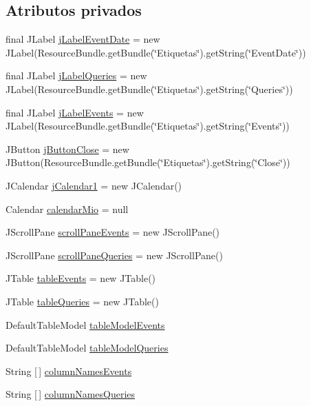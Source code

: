 \subsection*{Atributos privados}
\begin{DoxyCompactItemize}
\item 
final J\+Label \mbox{\hyperlink{classgui_1_1FindQuestionsGUI_a490e1658b079f1999219d1eb7c5bd0c4}{j\+Label\+Event\+Date}} = new J\+Label(Resource\+Bundle.\+get\+Bundle(\char`\"{}Etiquetas\char`\"{}).get\+String(\char`\"{}Event\+Date\char`\"{}))
\item 
final J\+Label \mbox{\hyperlink{classgui_1_1FindQuestionsGUI_a7e0f66edb87cb23a1ed731a4cbbf6679}{j\+Label\+Queries}} = new J\+Label(Resource\+Bundle.\+get\+Bundle(\char`\"{}Etiquetas\char`\"{}).get\+String(\char`\"{}Queries\char`\"{}))
\item 
final J\+Label \mbox{\hyperlink{classgui_1_1FindQuestionsGUI_a44489404c630d443ef23d756a0a59ddd}{j\+Label\+Events}} = new J\+Label(Resource\+Bundle.\+get\+Bundle(\char`\"{}Etiquetas\char`\"{}).get\+String(\char`\"{}Events\char`\"{}))
\item 
J\+Button \mbox{\hyperlink{classgui_1_1FindQuestionsGUI_aa434da3107eda36011f1dd89b1c02d65}{j\+Button\+Close}} = new J\+Button(Resource\+Bundle.\+get\+Bundle(\char`\"{}Etiquetas\char`\"{}).get\+String(\char`\"{}Close\char`\"{}))
\item 
J\+Calendar \mbox{\hyperlink{classgui_1_1FindQuestionsGUI_ae9cccb6f4b0319f8d786fa5040d6bed3}{j\+Calendar1}} = new J\+Calendar()
\item 
Calendar \mbox{\hyperlink{classgui_1_1FindQuestionsGUI_ae91cb03b6f7c5fd36436fcb4ec118613}{calendar\+Mio}} = null
\item 
J\+Scroll\+Pane \mbox{\hyperlink{classgui_1_1FindQuestionsGUI_ace1a155185cdae07dc3ed59a80f173fa}{scroll\+Pane\+Events}} = new J\+Scroll\+Pane()
\item 
J\+Scroll\+Pane \mbox{\hyperlink{classgui_1_1FindQuestionsGUI_a7657e8883157c1d005bb73744458bbf8}{scroll\+Pane\+Queries}} = new J\+Scroll\+Pane()
\item 
J\+Table \mbox{\hyperlink{classgui_1_1FindQuestionsGUI_a022fc8764d950afede789bb83ce7b5aa}{table\+Events}} = new J\+Table()
\item 
J\+Table \mbox{\hyperlink{classgui_1_1FindQuestionsGUI_a593cb17bb67700c97f5cf1dcd636526f}{table\+Queries}} = new J\+Table()
\item 
Default\+Table\+Model \mbox{\hyperlink{classgui_1_1FindQuestionsGUI_a142cc8ef4c568a9fa22bbd21393dcd66}{table\+Model\+Events}}
\item 
Default\+Table\+Model \mbox{\hyperlink{classgui_1_1FindQuestionsGUI_aec87a2a23f53df34886c52c6bb405666}{table\+Model\+Queries}}
\item 
String \mbox{[}$\,$\mbox{]} \mbox{\hyperlink{classgui_1_1FindQuestionsGUI_a7d72ae353614e87787788d83e329a2e7}{column\+Names\+Events}}
\item 
String \mbox{[}$\,$\mbox{]} \mbox{\hyperlink{classgui_1_1FindQuestionsGUI_abcca88495948619b8f7517aef8e846e6}{column\+Names\+Queries}}
\end{DoxyCompactItemize}
